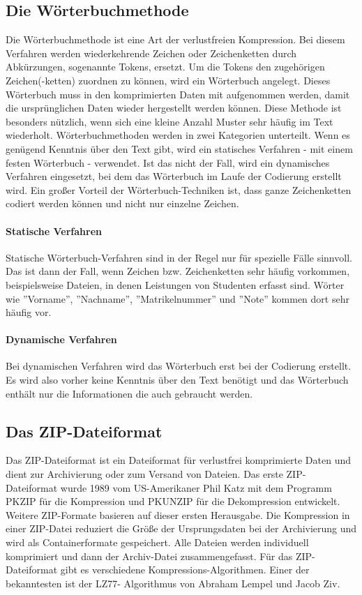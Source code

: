 \documentclass[10pt, a4paper]{article}
\begin{document}
\subsection{Die Wörterbuchmethode}
Die Wörterbuchmethode ist eine Art der verlustfreien Kompression. Bei diesem Verfahren werden wiederkehrende Zeichen oder Zeichenketten durch Abkürzungen, sogenannte Tokens, ersetzt. Um die Tokens den zugehörigen Zeichen(-ketten) zuordnen zu können, wird ein Wörterbuch angelegt. Dieses Wörterbuch muss in den komprimierten Daten mit aufgenommen werden, damit die ursprünglichen Daten wieder hergestellt werden können. Diese Methode ist besonders nützlich, wenn sich eine kleine Anzahl
Muster sehr häufig im Text wiederholt. Wörterbuchmethoden werden in zwei Kategorien unterteilt. Wenn es genügend Kenntnis über den Text gibt, wird ein statisches Verfahren - mit einem festen Wörterbuch - verwendet. Ist das nicht der Fall, wird ein dynamisches Verfahren eingesetzt, bei dem das Wörterbuch im Laufe der Codierung erstellt wird. Ein großer Vorteil der Wörterbuch-Techniken ist, dass ganze Zeichenketten codiert werden können und nicht nur einzelne Zeichen. \cite{website:woerterbuch, website:uni-trier}

\paragraph{Statische Verfahren}
Statische Wörterbuch-Verfahren sind in der Regel nur für spezielle Fälle sinnvoll. Das ist dann der Fall, wenn Zeichen bzw. Zeichenketten sehr häufig vorkommen, beispielsweise Dateien, in denen Leistungen von Studenten erfasst sind. Wörter wie ''Vorname'', ''Nachname'', ''Matrikelnummer'' und ''Note'' kommen dort sehr häufig vor. \cite{website:uni-trier}

\paragraph{Dynamische Verfahren}
Bei dynamischen Verfahren wird das Wörterbuch erst bei der Codierung erstellt. Es wird also vorher keine Kenntnis über den Text benötigt und das Wörterbuch enthält nur die Informationen die auch gebraucht werden. \cite{website:uni-trier}

\subsection{Das ZIP-Dateiformat}
Das ZIP-Dateiformat ist ein Dateiformat für verlustfrei komprimierte Daten und dient zur Archivierung oder zum Versand von Dateien. Das erste ZIP-Dateiformat wurde 1989 vom US-Amerikaner Phil Katz mit dem Programm PKZIP für die Kompression und PKUNZIP für die Dekompression entwickelt. Weitere ZIP-Formate basieren auf dieser ersten Herausgabe. 
Die Kompression in einer ZIP-Datei reduziert die Größe der Ursprungsdaten bei der Archivierung und wird als Containerformate gespeichert. Alle Dateien werden individuell komprimiert und dann der Archiv-Datei zusammengefasst. Für das ZIP-Dateiformat gibt es verschiedene Kompressions-Algorithmen. Einer der bekanntesten ist der LZ77- Algorithmus von Abraham Lempel und Jacob Ziv. \cite{website:zip}
\end{document}
